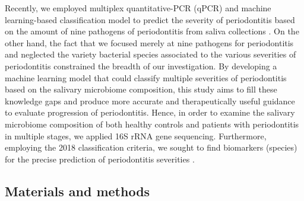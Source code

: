 \documentclass[11pt, a4paper, onecolumn, oneside]{report}
\begin{document}
            Recently, we employed multiplex quantitative-PCR (qPCR) and machine learning-based classification model to predict the severity of periodontitis based on the amount of nine pathogens of periodontitis from saliva collections \cite{Periodontitis-diagnosis-8}. On the other hand, the fact that we focused merely at nine pathogens for periodontitis and neglected the variety bacterial species associated to the various severities of periodontitis constrained the breadth of our investigation. By developing a machine learning model that could classify multiple severities of periodontitis based on the salivary microbiome composition, this study aims to fill these knowledge gaps and produce more accurate and therapeutically useful guidance to evaluate progression of periodontitis. Hence, in order to examine the salivary microbiome composition of both healthy controls and patients with periodontitis in multiple stages, we applied 16S rRNA gene sequencing. Furthermore, employing the 2018 classification criteria, we sought to find biomarkers (species) for the precise prediction of periodontitis severities \cite{Periodontitis-4, Periodontitis-13}.
        \newpage

        \subsection{Materials and methods}
\end{document}
